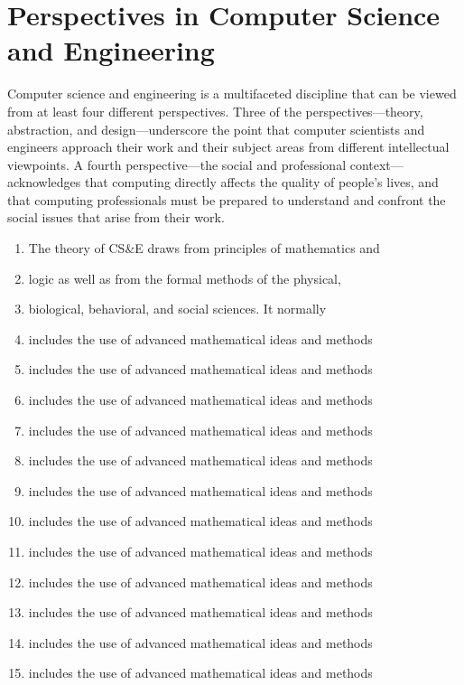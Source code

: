 \section{Perspectives in Computer Science and Engineering}

\noindent 
Computer science and engineering is a multifaceted discipline
that can be viewed from at least four different perspectives.
Three of the perspectives---theory, abstraction, and design---underscore 
the point that computer scientists and engineers
approach their work and their subject areas from different
intellectual viewpoints. A fourth perspective---the social and
professional context---acknowledges that computing directly
affects the quality of people's lives, and that computing
professionals must be prepared to understand and confront the
social issues that arise from their work.

\begin{enumerate}
\item
The theory of CS\&E draws from principles of mathematics and
\item
logic as well as from the formal methods of the physical,
\item
biological, behavioral, and social sciences. It normally
\item
includes the use of advanced mathematical ideas and methods
\item
includes the use of advanced mathematical ideas and methods
\item
includes the use of advanced mathematical ideas and methods
\item
includes the use of advanced mathematical ideas and methods
\item
includes the use of advanced mathematical ideas and methods
\item
includes the use of advanced mathematical ideas and methods
\item
includes the use of advanced mathematical ideas and methods
\item
includes the use of advanced mathematical ideas and methods
\item
includes the use of advanced mathematical ideas and methods
\item
includes the use of advanced mathematical ideas and methods
\item
includes the use of advanced mathematical ideas and methods
\item
includes the use of advanced mathematical ideas and methods
\end{enumerate}

